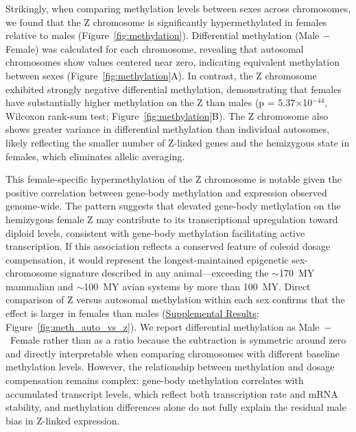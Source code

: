 \documentclass[12pt]{article}
\begin{document}
Strikingly, when comparing methylation levels between sexes across chromosomes,
we found that the Z chromosome is significantly hypermethylated in females relative to males (Figure~\ref{fig:methylation}).
Differential methylation (Male $-$ Female) was calculated for each chromosome,
revealing that autosomal chromosomes show values centered near zero,
indicating equivalent methylation between sexes (Figure~\ref{fig:methylation}A).
In contrast, the Z chromosome exhibited strongly negative differential methylation,
demonstrating that females have substantially higher methylation on the Z than males
(p = 5.37$\times$10$^{-44}$, Wilcoxon rank-sum test; Figure~\ref{fig:methylation}B).
The Z chromosome also shows greater variance in differential methylation than individual autosomes,
likely reflecting the smaller number of Z-linked genes and the hemizygous state in females,
which eliminates allelic averaging.

This female-specific hypermethylation of the Z chromosome is notable given the positive correlation
between gene-body methylation and expression observed genome-wide.
The pattern suggests that elevated gene-body methylation on the hemizygous female Z
may contribute to its transcriptional upregulation toward diploid levels,
consistent with gene-body methylation facilitating active transcription.
If this association reflects a conserved feature of coleoid dosage compensation,
it would represent the longest-maintained epigenetic sex-chromosome signature described
in any animal---exceeding the $\sim$170~MY mammalian and $\sim$100~MY avian systems
by more than 100~MY.
Direct comparison of Z versus autosomal methylation within each sex
confirms that the effect is larger in females than males
(\hyperref[sec:supp_methylation]{Supplemental Results}; Figure~\ref{fig:meth_auto_vs_z}).
We report differential methylation as Male~$-$~Female rather than as a ratio
because the subtraction is symmetric around zero and directly interpretable
when comparing chromosomes with different baseline methylation levels.
However, the relationship between methylation and dosage compensation remains complex:
gene-body methylation correlates with accumulated transcript levels,
which reflect both transcription rate and mRNA stability,
and methylation differences alone do not fully explain the residual male bias in Z-linked expression.
\end{document}
